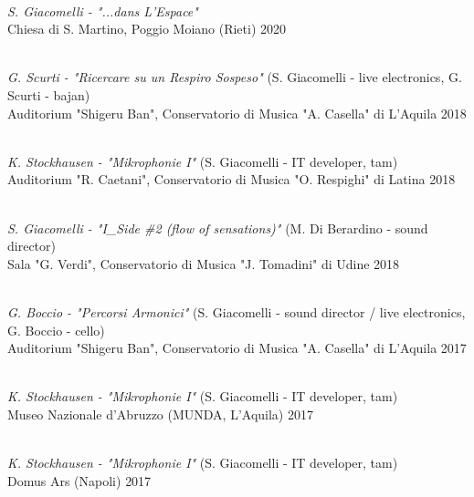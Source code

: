     {\\\textit{S. Giacomelli - "...dans L'Espace"}\\ 
    Chiesa di S. Martino, Poggio Moiano (Rieti)}
    {2020}

    {\\\textit{G. Scurti - "Ricercare su un Respiro Sospeso"} (S. Giacomelli - live electronics, G. Scurti - bajan)\\ 
    Auditorium "Shigeru Ban", Conservatorio di Musica "A. Casella" di L'Aquila}
    {2018}

    {\\\textit{K. Stockhausen - "Mikrophonie I"} (S. Giacomelli - IT developer, tam)\\ 
    Auditorium "R. Caetani", Conservatorio di Musica "O. Respighi" di Latina}
    {2018}

    {\\\textit{S. Giacomelli - "I\_Side \#2 (flow of sensations)"} (M. Di Berardino - sound director)\\ 
    Sala "G. Verdi", Conservatorio di Musica "J. Tomadini" di Udine}
    {2018}

    {\\\textit{G. Boccio - "Percorsi Armonici"} (S. Giacomelli - sound director / live electronics, G. Boccio - cello)\\ 
    Auditorium "Shigeru Ban", Conservatorio di Musica "A. Casella" di L'Aquila}
    {2017}

    {\\\textit{K. Stockhausen - "Mikrophonie I"} (S. Giacomelli - IT developer, tam)\\ 
    Museo Nazionale d'Abruzzo (MUNDA, L'Aquila)}
    {2017}

    {\\\textit{K. Stockhausen - "Mikrophonie I"} (S. Giacomelli - IT developer, tam)\\ 
    Domus Ars (Napoli)}
    {2017}

\resumeSubHeadingListEnd
\vspace{-5mm}